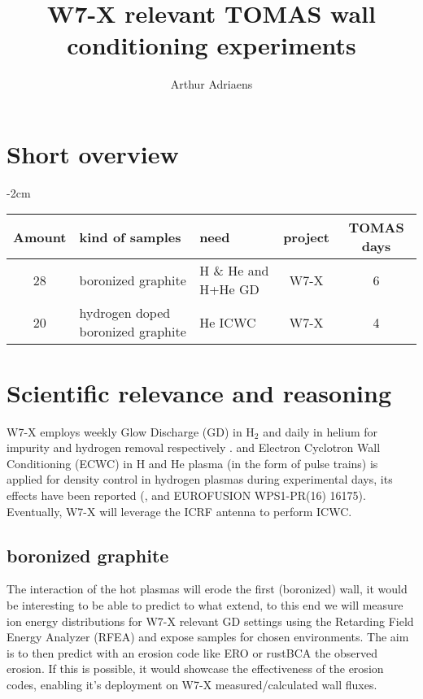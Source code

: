 \documentclass{article}
\title{W7-X relevant TOMAS wall conditioning experiments}
\author{Arthur Adriaens}
\begin{document}
\maketitle

\section{Short overview}
\begin{center}
    \addtolength{\leftskip} {-2cm} %
    \addtolength{\rightskip}{-2cm}
    \begin{tabular}{||c p{4cm} p{4cm} c c||}
         \hline
         Amount & kind of samples & need & project & TOMAS days \\ [0.5ex]
         \hline\hline
         28 & boronized graphite & H \& He and H+He GD & W7-X & 6 \\
         20 & hydrogen doped boronized graphite & He ICWC & W7-X & 4 \\
         \hline
    \end{tabular}
\end{center}
\section{Scientific relevance and reasoning}
W7-X employs weekly Glow Discharge (GD) in H$_2$ and daily in helium for
impurity and hydrogen removal respectively \cite{AndreiNucMatEn}. and Electron
Cyclotron Wall Conditioning (ECWC) in H and He plasma (in the form of pulse trains)
is applied for density control in hydrogen plasmas during experimental days, 
its effects have been reported (\cite{Goriaev_2020},\cite{WAUTERS2018235} and
EUROFUSION WPS1-PR(16) 16175). Eventually, W7-X will leverage the ICRF
antenna to perform ICWC.

\subsection*{boronized graphite}
The interaction of the hot plasmas will erode the first (boronized) wall, it
would be interesting to be able to predict to what extend, to this end we will
measure ion energy distributions for W7-X relevant GD settings using the
Retarding Field Energy Analyzer (RFEA) and expose samples for chosen
environments. The aim is to then predict with an erosion code like ERO or
rustBCA the observed erosion. If this is possible, it would showcase the
effectiveness of the erosion codes, enabling it's deployment on W7-X
measured/calculated wall fluxes.
\end{document}
